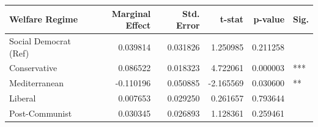 \begin{tabular}{lrrrrl}
\toprule
Welfare Regime & Marginal Effect & Std. Error & t-stat & p-value & Sig. \\
\midrule
Social Democrat (Ref) & 0.039814 & 0.031826 & 1.250985 & 0.211258 &  \\
Conservative & 0.086522 & 0.018323 & 4.722061 & 0.000003 & *** \\
Mediterranean & -0.110196 & 0.050885 & -2.165569 & 0.030600 & ** \\
Liberal & 0.007653 & 0.029250 & 0.261657 & 0.793644 &  \\
Post-Communist & 0.030345 & 0.026893 & 1.128361 & 0.259461 &  \\
\bottomrule
\end{tabular}
